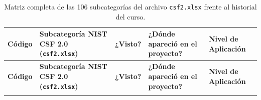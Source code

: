 \documentclass[letterpaper,11pt]{article}
\begin{document}
\begingroup
\scriptsize
\setlength{\tabcolsep}{3pt}
\renewcommand{\arraystretch}{1.15}
\begin{longtable}{|C{1.4cm}|L{5.4cm}|C{1.3cm}|L{4.3cm}|C{4.2cm}|}
\caption{Matriz completa de las 106 subcategorías del archivo \texttt{csf2.xlsx} frente al historial del curso.}
\label{tab:matriz-106} \\
\hline
{}
\textbf{Código} & \textbf{Subcategoría NIST CSF 2.0 (\texttt{csf2.xlsx})} & \textbf{¿Visto?} & \textbf{¿Dónde apareció en el proyecto?} & \textbf{Nivel de Aplicación} \\
\hline
\endfirsthead
\hline
{}
\textbf{Código} & \textbf{Subcategoría NIST CSF 2.0 (\texttt{csf2.xlsx})} & \textbf{¿Visto?} & \textbf{¿Dónde apareció en el proyecto?} & \textbf{Nivel de Aplicación} \\
\hline
\endhead
\hline
\endfoot


\end{longtable}
\end{document}
